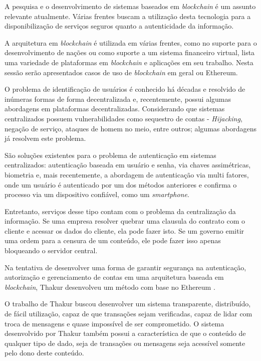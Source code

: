\documentclass[tcc,capa]{texufpel}
\begin{document}
    A pesquisa e o desenvolvimento de sistemas baseados em \textit{blockchain} é um assunto relevante atualmente. Várias frentes buscam a utilização desta tecnologia para a disponibilização de serviços seguros quanto a autenticidade da informação.
    
    A arquitetura em \textit{blockchain} é utilizada em várias frentes, como no suporte para o desenvolvimento de nações ou como suporte a um sistema financeiro virtual, \cite{gomez2017creating} lista uma variedade de plataformas em \textit{blockchain} e aplicações em seu trabalho. Nesta sessão serão apresentados casos de uso de \textit{blockchain} em geral ou Ethereum.
    
    O problema de identificação de usuários é conhecido há décadas e resolvido de inúmeras formas de forma decentralizada e, recentemente, possui algumas abordagens em plataformas decentralizadas. Considerando que sistemas centralizados possuem vulnerabilidades como sequestro de contas - \textit{Hijacking}, negação de serviço, ataques de homem no meio, entre outros; algumas abordagens já resolvem este problema.
    
    São soluções existentes para o problema de autenticação em sistemas centralizados: autenticação baseada em usuário e senha, via chaves assimétricas, biometria e, mais recentemente, a abordagem de autenticação via multi fatores, onde um usuário é autenticado por um dos métodos anteriores e confirma o processo via um dispositivo confiável, como um \textit{smartphone}.
    
    Entretanto, serviços desse tipo contam com o problema da centralização da informação. Se uma empresa resolver quebrar uma clausula do contrato com o cliente e acessar os dados do cliente, ela pode fazer isto. Se um governo emitir uma ordem para a censura de um conteúdo, ele pode fazer isso apenas bloqueando o servidor central.
    
    Na tentativa de desenvolver uma forma de garantir segurança na autenticação, autorização e gerenciamento de contas em uma arquitetura baseada em \textit{blockchain}, Thakur desenvolveu um método com base no Ethereum \cite{thakur2017authentication}.
    
    O trabalho de Thakur buscou desenvolver um sistema transparente, distribuído, de fácil utilização, capaz de que transações sejam verificadas, capaz de lidar com troca de mensagens e quase impossível de ser comprometido. O sistema desenvolvido por Thakur também possui a característica de que o conteúdo de qualquer tipo de dado, seja de transações ou mensagens seja acessível somente pelo dono deste conteúdo.
    
\end{document}
